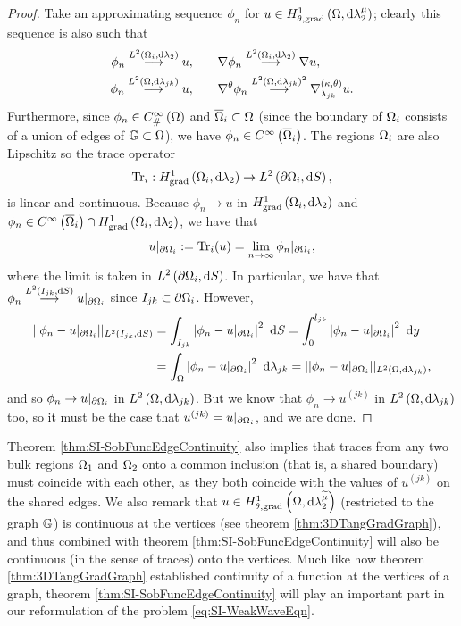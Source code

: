 \begin{proof}
	Take an approximating sequence $\phi_n$ for $u\in H^1_{\theta, \mathrm{grad}}\left( \Omega, \mathrm{d}\lambda_2^{\mu} \right)$; clearly this sequence is also such that
	\begin{align*}
		\phi_n \overset{L^{2}\left( \Omega_i,\mathrm{d} \lambda_2 \right)}{\longrightarrow} u, &\qquad \nabla\phi_n\overset{L^{2}\left( \Omega_i,\mathrm{d} \lambda_2 \right)}{\longrightarrow}\nabla u, \\
		\phi_n \overset{L^{2}\left( \Omega,\mathrm{d} \lambda_{jk} \right)}{\longrightarrow} u, &\qquad \nabla^{\theta}\phi_n\overset{L^{2}\left( \Omega,\mathrm{d} \lambda_{jk} \right)^2}{\longrightarrow}\nabla^{\left( \kappa, \theta \right)}_{\lambda_{jk}} u.
	\end{align*}
	Furthermore, since $\phi_n\in C^{\infty}_{\#}\left( \Omega \right)$ and $\overline{\Omega}_i\subset\Omega$ (since the boundary of $\Omega_i$ consists of a union of edges of $\mathbb{G}\subset\Omega$), we have $\phi_n\in C^{\infty}\left( \overline{\Omega}_i \right)$.
	The regions $\Omega_i$ are also Lipschitz so the trace operator
	\begin{align*}
		\mathrm{Tr}_i: H^1_\mathrm{grad}\left( \Omega_i, \mathrm{d}\lambda_2 \right) \rightarrow L^{2}\left( \partial\Omega_i,\mathrm{d} S \right),
	\end{align*}
	is linear and continuous.
	Because $\phi_n\rightarrow u$ in $H^1_\mathrm{grad}\left( \Omega_i, \mathrm{d}\lambda_2 \right)$ and $\phi_n\in C^{\infty}\left( \overline{\Omega}_i \right)\cap H^1_\mathrm{grad}\left( \Omega_i, \mathrm{d}\lambda_2 \right)$, we have that
	\begin{align*}
		u\vert_{\partial\Omega_i} := \mathrm{Tr}_i(u) = \lim_{n\rightarrow\infty}\phi_n\vert_{\partial\Omega_i},
	\end{align*}
	where the limit is taken in $L^{2}\left( \partial\Omega_i,\mathrm{d} S \right)$.
	In particular, we have that $\phi_n\overset{L^{2}\left( I_{jk},\mathrm{d} S \right)}{\longrightarrow}u\vert_{\partial\Omega_i}$ since $I_{jk}\subset\partial\Omega_i$.
	However,
	\begin{align*}
		\norm{ \phi_n - u\vert_{\partial\ddom_i} }_{\ltwo{I_{jk}}{S}}
		&= \integral{I_{jk}}{\abs{ \phi_n - u\vert_{\partial\ddom_i} }^2}{S}
		= \int_0^{l_{jk}} \abs{ \phi_n - u\vert_{\partial\ddom_i} }^2 \ \md y \\
		&= \integral{\ddom}{\abs{ \phi_n - u\vert_{\partial\ddom_i} }^2}{\lambda_{jk}}
		= \norm{ \phi_n - u\vert_{\partial\ddom_i} }_{\ltwo{\ddom}{\lambda_{jk}}},
	\end{align*}
	and so $\phi_n\rightarrow u\vert_{\partial\Omega_i}$ in $L^{2}\left( \Omega,\mathrm{d} \lambda_{jk} \right)$.
	But we know that $\phi_n\rightarrow u^{(jk)}$ in $L^{2}\left( \Omega,\mathrm{d} \lambda_{jk} \right)$ too, so it must be the case that $u^{(jk)} = u\vert_{\partial\Omega_i}$, and we are done.
\end{proof}
Theorem \ref{thm:SI-SobFuncEdgeContinuity} also implies that traces from any two bulk regions $\Omega_1$ and $\Omega_2$ onto a common inclusion (that is, a shared boundary) must coincide with each other, as they both coincide with the values of $u^{(jk)}$ on the shared edges.
We also remark that $u\in H^1_{\theta, \mathrm{grad}}\left( \Omega, \mathrm{d}\lambda_2^{\widetilde{\mu}} \right)$ (restricted to the graph $\mathbb{G}$) is continuous at the vertices (see theorem \ref{thm:3DTangGradGraph}), and thus combined with theorem \ref{thm:SI-SobFuncEdgeContinuity} will also be continuous (in the sense of traces) onto the vertices.
Much like how theorem \ref{thm:3DTangGradGraph} established continuity of a function at the vertices of a graph, theorem \ref{thm:SI-SobFuncEdgeContinuity} will play an important part in our reformulation of the problem \eqref{eq:SI-WeakWaveEqn}.